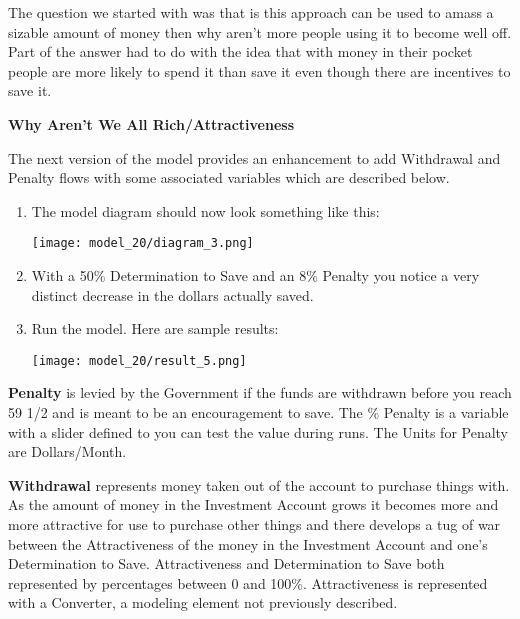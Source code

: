 \documentclass[]{memoir}
\makeatletter
\def\maxwidth{\ifdim\Gin@nat@width>\linewidth\linewidth
\else\Gin@nat@width\fi}
\let\Oldincludegraphics\includegraphics
\renewcommand{\includegraphics}[1]{\Oldincludegraphics[width=\maxwidth]{#1}}
\makeatother
\begin{document}
The question we started with was that is this approach can be used to
amass a sizable amount of money then why aren't more people using it to
become well off. Part of the answer had to do with the idea that with
money in their pocket people are more likely to spend it than save it
even though there are incentives to save it.

\FloatBarrier 

\begin{oframed}\textbf{Why Aren't We All Rich/Attractiveness} 

 The next version of the model provides an enhancement to add Withdrawal and Penalty flows with some associated variables which are described below.

\begin{enumerate}
\item The model diagram should now look something like this: \par \begin{minipage}{\linewidth}  \centering \texttt{[image: model\_20/diagram\_3.png]}
\end{minipage}
\item 

With a 50\% Determination to Save and an 8\% Penalty you notice a very distinct decrease in the dollars actually saved.


\item Run the model. Here are sample results:\par \begin{minipage}{\linewidth}  \centering \texttt{[image: model\_20/result\_5.png]}
\end{minipage}

\end{enumerate} \end{oframed}

\textbf{Penalty} is levied by the Government if the funds are withdrawn
before you reach 59 1/2 and is meant to be an encouragement to save. The
\% Penalty is a variable with a slider defined to you can test the value
during runs. The Units for Penalty are Dollars/Month.

\textbf{Withdrawal} represents money taken out of the account to
purchase things with. As the amount of money in the Investment Account
grows it becomes more and more attractive for use to purchase other
things and there develops a tug of war between the Attractiveness of the
money in the Investment Account and one's Determination to Save.
Attractiveness and Determination to Save both represented by percentages
between 0 and 100\%. Attractiveness is represented with a Converter, a
modeling element not previously described.
\end{document}
